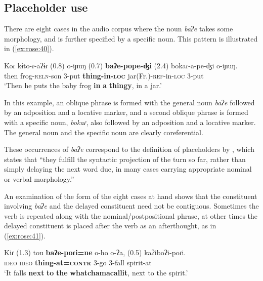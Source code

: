 \documentclass[output=paper]{langscibook}
\begin{document}
\subsection{Placeholder use}
\label{sec:rose:4.2}

There are eight cases in the audio corpus where the noun \textit{baʔe} takes some morphology, and is further specified by a specific noun. This pattern is illustrated in (\ref{ex:rose:40}).


\ea \label{ex:rose:40}
\gll Koɾ  kɨto-ɾ-aʔɨɾ (0.8)  o-iɲuŋ (0.7) \textbf{baʔe-pope-ʤi} (2.4) bokaɾ-a-pe-ʤi  o-iɲuŋ.\\
then  frog-\textsc{reln}-son {} 3-put {} \textbf{thing-in\textsc{-loc}} {} jar(Fr.)-\textsc{ref}-in\textsc{-loc}  3-put\\
\glt ‘Then he puts the baby frog \textbf{in} \textbf{a} \textbf{thingy}, in a jar.’ 
\z

In this example, an oblique phrase is formed with the general noun \textit{baʔe} followed by an adposition and a locative marker, and a second oblique phrase is formed with a specific noun, \textit{bokaɾ}, also followed by an adposition and a locative marker. The general noun and the specific noun are clearly coreferential. 

These occurrences of \textit{baʔe} correspond to the definition of placeholders by \citet[2]{Fox2010}, which states that “they fulfill the syntactic projection of the turn so far, rather than simply delaying the next word due, in many cases carrying appropriate nominal or verbal morphology.”

An examination of the form of the eight cases at hand shows that the constituent involving \textit{baʔe} and the delayed constituent need not be contiguous. Sometimes the verb is repeated along with the nominal/postpositional phrase, at other times the delayed constituent is placed after the verb as an afterthought, as in (\ref{ex:rose:41}). 


\ea \label{ex:rose:41}
\gll Kiɾ (1.3)  tou  \textbf{baʔe-poɾi=ne}  o-ho  o-ʔa, (0.5) kaʔiboʔi-poɾi.\\
\textsc{ideo} {} \textsc{ideo}  \textbf{thing-at=\textsc{contr}}  3-go  3-fall  {} spirit-at\\
\glt ‘It falls \textbf{next} \textbf{to} \textbf{the} \textbf{whatchamacallit}, next to the spirit.’ 
\z 
\end{document}
